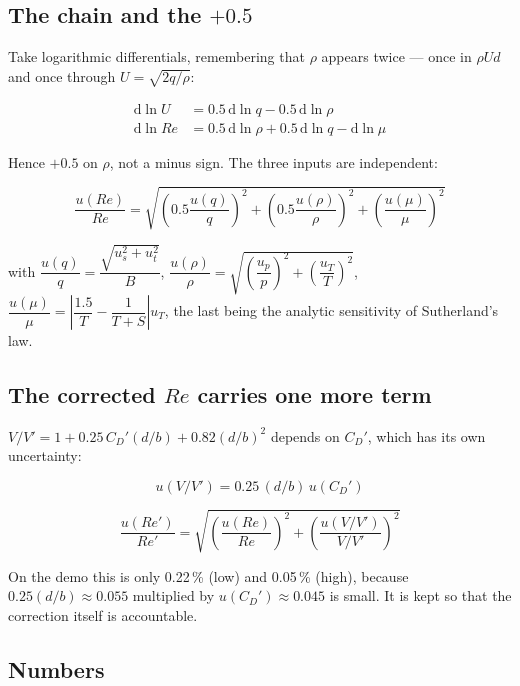 \documentclass[11pt,a4paper]{article}
\newcommand{\CD}{\ensuremath{C_D}}
\newcommand{\ReD}{\ensuremath{\mathit{Re}}}
\begin{document}
\subsection{The chain and the $+0.5$}

Take logarithmic differentials, remembering that $\rho$ appears twice --- once in $\rho U d$ and
once through $U = \sqrt{2q/\rho}$:

\begin{align}
\mathrm{d}\ln U &= 0.5\,\mathrm{d}\ln q - 0.5\,\mathrm{d}\ln\rho \\
\mathrm{d}\ln \ReD &= 0.5\,\mathrm{d}\ln\rho + 0.5\,\mathrm{d}\ln q - \mathrm{d}\ln\mu
\end{align}

Hence $+0.5$ on $\rho$, not a minus sign. The three inputs are independent:

\begin{equation}
\frac{u(\ReD)}{\ReD} = \sqrt{\left(0.5\frac{u(q)}{q}\right)^2
+ \left(0.5\frac{u(\rho)}{\rho}\right)^2 + \left(\frac{u(\mu)}{\mu}\right)^2}
\end{equation}

with
$\dfrac{u(q)}{q} = \dfrac{\sqrt{u_s^2 + u_t^2}}{B}$,
$\dfrac{u(\rho)}{\rho} = \sqrt{\left(\dfrac{u_p}{p}\right)^2 + \left(\dfrac{u_T}{T}\right)^2}$,
$\dfrac{u(\mu)}{\mu} = \left|\dfrac{1.5}{T} - \dfrac{1}{T+S}\right|u_T$,
the last being the analytic sensitivity of Sutherland's law.

\subsection{The corrected \ReD{} carries one more term}

$V/V' = 1 + 0.25\,\CD'(d/b) + 0.82(d/b)^2$ depends on $\CD'$, which has its own uncertainty:

\begin{equation}
u(V/V') = 0.25\,(d/b)\,u(\CD')
\end{equation}

\begin{equation}
\frac{u(\ReD')}{\ReD'} = \sqrt{\left(\frac{u(\ReD)}{\ReD}\right)^2
+ \left(\frac{u(V/V')}{V/V'}\right)^2}
\end{equation}

On the demo this is only 0.22\,\% (low) and 0.05\,\% (high), because $0.25(d/b) \approx 0.055$
multiplied by $u(\CD') \approx 0.045$ is small. It is kept so that the correction itself is
accountable.

\subsection{Numbers}
\end{document}
